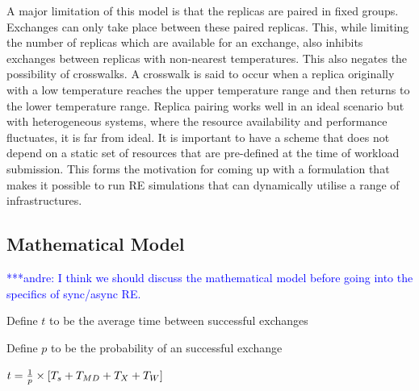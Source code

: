 \documentclass{rspublic}
\newcommand{\jhanote}[1]{ {\textcolor{red} { ***shantenu: #1 }}}
\newcommand{\alnote}[1]{ {\textcolor{blue} { ***andre: #1 }}}
\newcommand{\alnote}[1]{}
\newcommand{\jhanote}[1]{}
\begin{document}
A major limitation of this model is that the replicas are paired in fixed groups. 
Exchanges can only take place between these paired replicas.
This, while limiting the number of replicas which are available for an exchange, also inhibits exchanges between replicas with non-nearest temperatures. This also negates the possibility of crosswalks. A crosswalk is said to occur when a replica originally with a low temperature reaches the upper temperature range and then returns to the lower temperature range. %
Replica pairing works well in an ideal scenario but with heterogeneous
systems, where the resource availability and performance fluctuates,
it is far from ideal. It is important to have a scheme that does not
depend on a static  set of
resources that are pre-defined at the time of workload submission.
This forms the motivation for coming up with a formulation that makes
it possible to run RE simulations that can dynamically utilise a range
of infrastructures.
  

\subsection{Mathematical Model}
\alnote{I think we should discuss the mathematical model before going into the specifics of sync/async RE.}

Define $t$ to be the average time between successful exchanges

Define $p$ to be the probability of an successful exchange

$t=  {1 \over p} \times {[T_s+T_{MD} + T_{X} + T_{W}]} $
\end{document}
